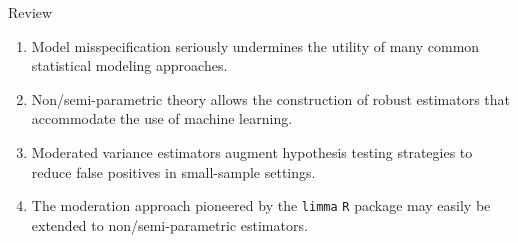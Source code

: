 \documentclass{beamer}
\begin{document}
\begin{frame}[c]{Review}
\begin{center}
\begin{enumerate}
  \itemsep12pt
  \item Model misspecification seriously undermines the utility of many common
    statistical modeling approaches.
  \item Non/semi-parametric theory allows the construction of robust estimators
    that accommodate the use of machine learning.
  \item Moderated variance estimators augment hypothesis testing strategies to
    reduce false positives in small-sample settings.
  \item The moderation approach pioneered by the \texttt{limma} \texttt{R}
    package may easily be extended to non/semi-parametric estimators.
\end{enumerate}
\end{center}


\end{frame}


\begin{frame}[c,allowframebreaks]{}

\small



\end{frame}

\end{document}
